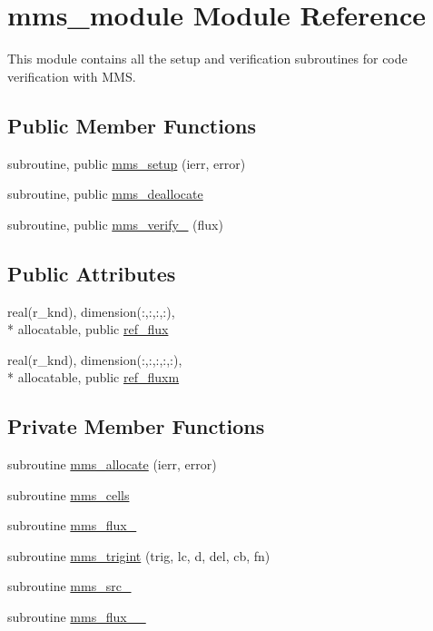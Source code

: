 \hypertarget{classmms__module}{\section{mms\-\_\-module Module Reference}
\label{classmms__module}
}


This module contains all the setup and verification subroutines for code verification with M\-M\-S.  


\subsection*{Public Member Functions}
\begin{DoxyCompactItemize}
\item 
subroutine, public \hyperlink{classmms__module_af6e2504f62297dcb69f3939549152fef}{mms\-\_\-setup} (ierr, error)
\item 
subroutine, public \hyperlink{classmms__module_ae6195b5333d8369babda3da8875a6f22}{mms\-\_\-deallocate}
\item 
subroutine, public \hyperlink{classmms__module_a37e1faf94ca3526af48c3e8efc1d332a}{mms\-\_\-verify\-\_} (flux)
\end{DoxyCompactItemize}
\subsection*{Public Attributes}
\begin{DoxyCompactItemize}
\item 
real(r\-\_\-knd), dimension(\-:,\-:,\-:,\-:), \\*
allocatable, public \hyperlink{classmms__module_a20157f9a49b1c0b449c340b7b1a63791}{ref\-\_\-flux}
\item 
real(r\-\_\-knd), dimension(\-:,\-:,\-:,\-:,\-:), \\*
allocatable, public \hyperlink{classmms__module_aaa592b5b9f1591e2a34df390563b0c56}{ref\-\_\-fluxm}
\end{DoxyCompactItemize}
\subsection*{Private Member Functions}
\begin{DoxyCompactItemize}
\item 
subroutine \hyperlink{classmms__module_ab75ca017795268e2e798920ed82058c0}{mms\-\_\-allocate} (ierr, error)
\item 
subroutine \hyperlink{classmms__module_a62f471d104fd6b83a9a0649115e4103e}{mms\-\_\-cells}
\item 
subroutine \hyperlink{classmms__module_a7182d71cc52a5cb7402d649bb17b0af9}{mms\-\_\-flux\-\_}
\item 
subroutine \hyperlink{classmms__module_a92298f4f6f9a03d54169aee15197f591}{mms\-\_\-trigint} (trig, lc, d, del, cb, fn)
\item 
subroutine \hyperlink{classmms__module_aa571bba8b81b30ec0d1560f2d6bd4e2a}{mms\-\_\-src\-\_}
\item 
subroutine \hyperlink{classmms__module_a8ed588a3dafe93834940e9df3460969b}{mms\-\_\-flux\-\_\-\_}
\end{DoxyCompactItemize}
